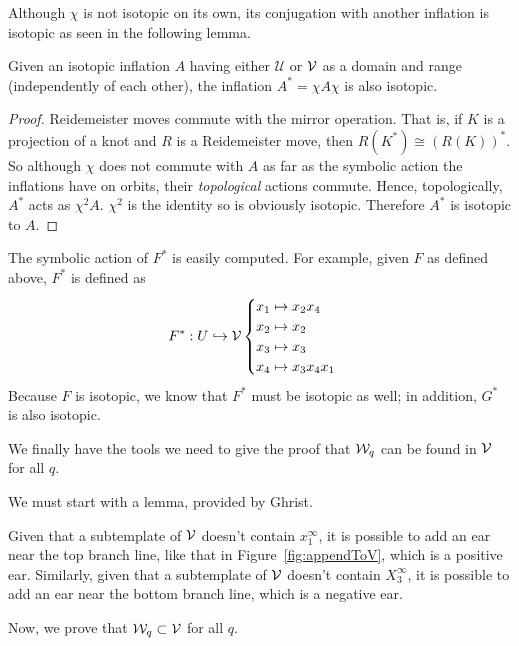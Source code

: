 \documentclass[paper.tex]{subfiles}
\begin{document}
    Although $\chi$ is not isotopic on its own, its conjugation with another inflation is isotopic as seen in the following lemma.

    \begin{lemma}[Ghrist 1997]
        Given an isotopic inflation $A$ having either $\mathcal{U}$ or $\mathcal{V}$ as a domain and range (independently of each other), the inflation $A^* = \chi A \chi$ is also isotopic.
    \end{lemma}

    \begin{proof}
      Reidemeister moves commute with the mirror operation. That is, if $K$ is a projection of a knot and $R$ is a Reidemeister move, then $R(K^\ast)  \cong  {(R(K))}^\ast$. So although $\chi$ does not commute with $A$ as far as the symbolic
      action the inflations have on orbits, their \emph{topological} actions commute. Hence, topologically, $A^\ast$ acts as $\chi^2 A$. $\chi^2$ is the identity so is obviously isotopic. Therefore $A^\ast$ is isotopic to $A$.
    \end{proof}



The symbolic action of $F^\ast$ is easily computed. For example, given $F$ as defined above, $F^*$ is defined as $$F^*: U \hookrightarrow \mathcal{V} \begin{cases} x_1 \mapsto x_2 x_4 \\ x_2 \mapsto x_2 \\ x_3 \mapsto x_3 \\ x_4 \mapsto x_3 x_4 x_1 \end{cases}$$ Because $F$ is isotopic, we know that $F^*$ must be isotopic as well; in addition, $G^*$ is also isotopic.

We finally have the tools we need to give the proof that $\mathcal{W}_q$ can be found in $\mathcal{V}$ for all $q$.

We must start with a lemma, provided by Ghrist.
\begin{lemma}[Ghrist 1997]
    Given that a subtemplate of $\mathcal{V}$ doesn't contain $x_1^\infty$, it is possible to add an ear near the top branch line, like that in Figure~\ref{fig:appendToV}, which is a positive ear. Similarly, given that a subtemplate of $\mathcal{V}$ doesn't contain $X_3^\infty$, it is possible to add an ear near the bottom branch line, which is a negative ear.
\end{lemma}


Now, we prove that $\mathcal{W}_q \subset \mathcal{V}$ for all $q$.
\end{document}
